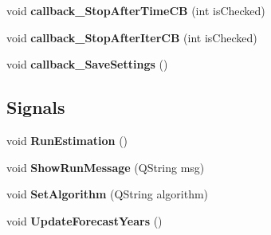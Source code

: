 \begin{DoxyCompactItemize}
\item 
void {\bfseries callback\+\_\+\+Stop\+After\+Time\+CB} (int is\+Checked)\hypertarget{classnmf_estimation___tab6_a598ae12325d506f449464de250bcb630}{}\label{classnmf_estimation___tab6_a598ae12325d506f449464de250bcb630}

\item 
void {\bfseries callback\+\_\+\+Stop\+After\+Iter\+CB} (int is\+Checked)\hypertarget{classnmf_estimation___tab6_ac6abc74e89aae1d73cd1d7c11cd89ace}{}\label{classnmf_estimation___tab6_ac6abc74e89aae1d73cd1d7c11cd89ace}

\item 
void {\bfseries callback\+\_\+\+Save\+Settings} ()\hypertarget{classnmf_estimation___tab6_a9397e07d0e936c72472ef817b9772155}{}\label{classnmf_estimation___tab6_a9397e07d0e936c72472ef817b9772155}

\end{DoxyCompactItemize}
\subsection*{Signals}
\begin{DoxyCompactItemize}
\item 
void {\bfseries Run\+Estimation} ()\hypertarget{classnmf_estimation___tab6_a5d492244aaf92c83b35fab7910874fd2}{}\label{classnmf_estimation___tab6_a5d492244aaf92c83b35fab7910874fd2}

\item 
void {\bfseries Show\+Run\+Message} (Q\+String msg)\hypertarget{classnmf_estimation___tab6_ad80fb4377497582c445bfe713e1d6c60}{}\label{classnmf_estimation___tab6_ad80fb4377497582c445bfe713e1d6c60}

\item 
void {\bfseries Set\+Algorithm} (Q\+String algorithm)\hypertarget{classnmf_estimation___tab6_a584d6f7ae74fa3decbc301db83fa3b14}{}\label{classnmf_estimation___tab6_a584d6f7ae74fa3decbc301db83fa3b14}

\item 
void {\bfseries Update\+Forecast\+Years} ()\hypertarget{classnmf_estimation___tab6_a3cde0546fa42f1e25fc48b5b01ec72ad}{}\label{classnmf_estimation___tab6_a3cde0546fa42f1e25fc48b5b01ec72ad}

\end{DoxyCompactItemize}

